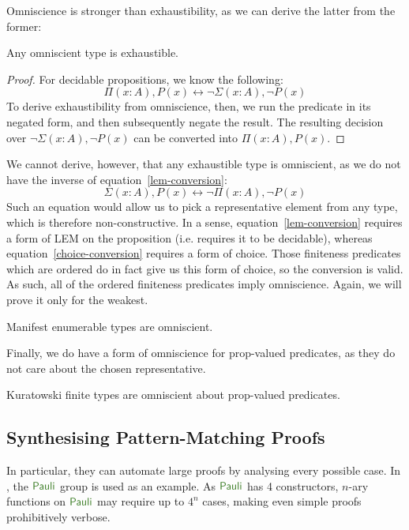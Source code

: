 Omniscience is stronger than exhaustibility, as we can derive the latter from
the former:
\begin{romlemma} \label{omniscient-is-exhaustible}
  Any omniscient type is exhaustible.
\end{romlemma}
\begin{proof}
  For decidable propositions, we know the following:
  \begin{equation} \label{lem-conversion}
    \Pi (x : A) , P(x) \leftrightarrow \neg \Sigma (x : A) , \neg P(x) 
  \end{equation}
  To derive exhaustibility from omniscience, then, we run the predicate in its
  negated form, and then subsequently negate the result.
  The resulting decision over \(\neg \Sigma(x : A) , \neg P(x)\) can be
  converted into \(\Pi (x : A) , P(x)\).
\end{proof}
We cannot derive, however, that any exhaustible type is omniscient, as we do not
have the inverse of equation~\ref{lem-conversion}:
\begin{equation} \label{choice-conversion}
  \Sigma (x : A) , P(x) \leftrightarrow \neg \Pi (x : A) , \neg P(x)
\end{equation}
Such an equation would allow us to pick a representative element from any type,
which is therefore non-constructive.
In a sense, equation~\ref{lem-conversion} requires a form of LEM on the
proposition (i.e. requires it to be decidable), whereas
equation~\ref{choice-conversion} requires a form of choice.
Those finiteness predicates which are ordered do in fact give us this form of
choice, so the conversion is valid.
As such, all of the ordered finiteness predicates imply omniscience.
Again, we will prove it only for the weakest.
\begin{romtheorem}
  Manifest enumerable types are omniscient.
\end{romtheorem}
Finally, we do have a form of omniscience for prop-valued predicates, as they do
not care about the chosen representative.
\begin{romtheorem}
  Kuratowski finite types are omniscient about prop-valued predicates.
\end{romtheorem}
\subsection{Synthesising Pattern-Matching Proofs}
In particular, they can automate large proofs by analysing every possible case.
In \cite{firsovDependentlyTypedProgramming2015}, the \(\AgdaDatatype{Pauli}\)
group is used as an example.
As \(\AgdaDatatype{Pauli}\) has 4 constructors, \(n\)-ary functions on
\(\AgdaDatatype{Pauli}\) may require up to \(4^n\) cases, making even simple
proofs prohibitively verbose.

